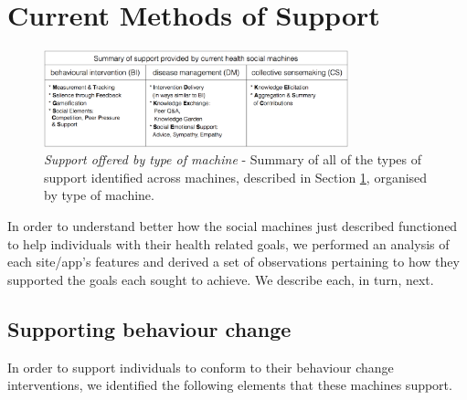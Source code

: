 \documentclass{www13-companion-accepted}
\begin{document}
\section{Current Methods of Support}
\label{sec:support}
\begin{figure}[tb]
\begin{center}
\includegraphics[width=8.8cm]{img/table2-summary.png}
\caption{\emph{Support offered by type of machine} - Summary of all of
  the types of support identified across machines, described in
  Section \ref{sec:support}, organised by type of machine.} \label{fig:summaryofsupport}
\end{center}
\end{figure}


In order to understand better how the social machines just described
functioned to help individuals with their health related goals, we
performed an analysis of each site/app's features and derived a set of
observations pertaining to how they supported the goals each sought to
achieve.  We describe each, in turn, next.

\subsection{Supporting behaviour change}
\label{sec:intervention}

In order to support individuals to conform to their behaviour change
interventions, we identified the following elements that these machines
support.
\end{document}
